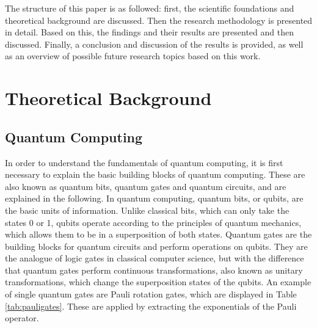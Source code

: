 The structure of this paper is as followed: first, the scientific foundations and theoretical background are discussed. Then the research methodology is presented in detail. Based on this, the findings and their results are presented and then discussed. Finally, a conclusion and discussion of the results is provided, as well as an overview of possible future research topics based on this work.   

\section{Theoretical Background}
\subsection{Quantum Computing}
In order to understand the fundamentals of quantum computing, it is first necessary to explain the basic building blocks of quantum computing. These are also known as quantum bits, quantum gates and quantum circuits, and are explained in the following. In quantum computing, quantum bits, or qubits, are the basic units of information. Unlike classical bits, which can only take the states 0 or 1, qubits operate according to the principles of quantum mechanics, which allows them to be in a superposition of both states. \cite{claudino2022basics} Quantum gates are the building blocks for quantum circuits and perform operations on qubits. They are the analogue of logic gates in classical computer science, but with the difference that quantum gates perform continuous transformations, also known as unitary transformations, which change the superposition states of the qubits. An example of single quantum gates are Pauli rotation gates, which are displayed in Table \ref{tab:pauligates}. These are applied by extracting the exponentials of the Pauli operator.


